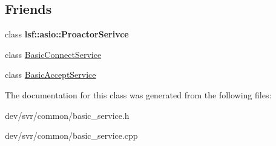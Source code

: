 \subsection*{Friends}
\begin{DoxyCompactItemize}
\item 
\hypertarget{classBasicService_a8e807eb450b87a443cee5956b3d556d3}{
class {\bfseries lsf::asio::ProactorSerivce}}
\label{classBasicService_a8e807eb450b87a443cee5956b3d556d3}

\item 
\hypertarget{classBasicService_ac6596f54b8531adba8f8d815c90ece07}{
class \hyperlink{classBasicService_ac6596f54b8531adba8f8d815c90ece07}{BasicConnectService}}
\label{classBasicService_ac6596f54b8531adba8f8d815c90ece07}

\item 
\hypertarget{classBasicService_a2890aca0e9b4b0f09262a099c42a7767}{
class \hyperlink{classBasicService_a2890aca0e9b4b0f09262a099c42a7767}{BasicAcceptService}}
\label{classBasicService_a2890aca0e9b4b0f09262a099c42a7767}

\end{DoxyCompactItemize}


The documentation for this class was generated from the following files:\begin{DoxyCompactItemize}
\item 
dev/svr/common/basic\_\-service.h\item 
dev/svr/common/basic\_\-service.cpp\end{DoxyCompactItemize}

